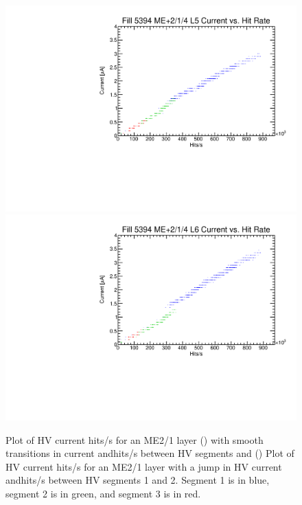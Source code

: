 \begin{figure}
	\centering
	\includegraphics[width=\twoThirdsFigWidth]{figures/neutron/ME21_P_04_5_f5394_curr_hitrate.pdf}
	\includegraphics[width=\twoThirdsFigWidth]{figures/neutron/ME21_P_04_6_f5394_curr_hitrate.pdf}
  \caption[Plot of HV current \vs\unit{hits/s} for an ME2/1 layer with smooth transitions in current and a jump in HV current.]{Plot of HV current \vs\unit{hits/s} for an ME2/1 layer () with smooth transitions in current and\unit{hits/s} between HV segments and () Plot of HV current \vs\unit{hits/s} for an ME2/1 layer with a jump in HV current and\unit{hits/s} between HV segments 1 and 2. Segment 1 is in blue, segment 2 is in green, and segment 3 is in red.}
	\label{fig:ME21_IvsH}
\end{figure}

